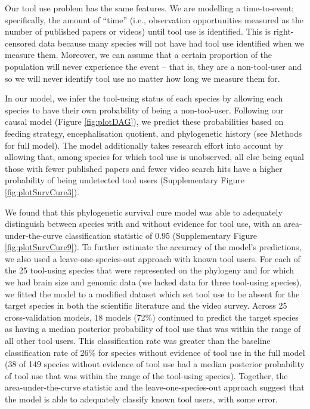 \documentclass[
  man, donotrepeattitle,floatsintext]{apa6}
\begin{document}
Our tool use problem has the same features. We are modelling a time-to-event;
specifically, the amount of ``time'' (i.e., observation opportunities measured as
the number of published papers or videos) until tool use is identified. This is
right-censored data because many species will not have had tool use identified
when we measure them. Moreover, we can assume that a certain proportion of the
population will never experience the event -- that is, they are a non-tool-user
and so we will never identify tool use no matter how long we measure them for.

In our model, we infer the tool-using status of each species by allowing each
species to have their own probability of being a non-tool-user. Following our
causal model (Figure \ref{fig:plotDAG}), we predict these probabilities based
on feeding strategy, encephalisation quotient, and phylogenetic history (see
Methods for full model). The model additionally takes research effort into
account by allowing that, among species for which tool use is unobserved, all
else being equal those with fewer published papers and fewer video search hits
have a higher probability of being undetected tool users (Supplementary Figure
\ref{fig:plotSurvCure3}).

We found that this phylogenetic survival cure model was able to adequately
distinguish between species with and without evidence for tool use, with an
area-under-the-curve classification statistic of
0.95 (Supplementary Figure
\ref{fig:plotSurvCure9}). To further estimate the accuracy of the model's
predictions, we also used a leave-one-species-out approach with known tool
users. For each of the 25 tool-using species that were represented on the
phylogeny and for which we had brain size and genomic data (we lacked data for
three tool-using species), we fitted the model to a modified dataset which set
tool use to be absent for the target species in both the scientific literature
and the video survey. Across 25 cross-validation models,
18 models (72\%)
continued to predict the target species as having a median posterior probability
of tool use that was within the range of all other tool users. This
classification rate was greater than the baseline classification rate of
26\%
for species without evidence of tool use in the full model
(38
of 149 species without
evidence of tool use had a median posterior probability of tool use that was
within the range of the tool-using species). Together, the area-under-the-curve
statistic and the leave-one-species-out approach suggest that the model is able
to adequately classify known tool users, with some error.
\end{document}
